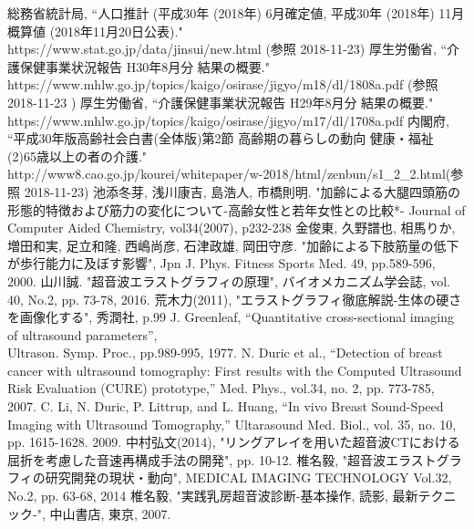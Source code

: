 \begin{thebibliography}{9}
   総務省統計局, 
    ``人口推計 (平成30年 (2018年) 6月確定値, 平成30年 (2018年) 11月概算値 (2018年11月20日公表)." \\https://www.stat.go.jp/data/jinsui/new.html  (参照 2018-11-23)
   厚生労働省,
    ``介護保健事業状況報告 H30年8月分 結果の概要." \\https://www.mhlw.go.jp/topics/kaigo/osirase/jigyo/m18/dl/1808a.pdf  (参照 2018-11-23 )
    厚生労働省,
    ``介護保健事業状況報告 H29年8月分 結果の概要." \\https://www.mhlw.go.jp/topics/kaigo/osirase/jigyo/m17/dl/1708a.pdf
     内閣府,
    ``平成30年版高齢社会白書(全体版)第2節 高齢期の暮らしの動向 健康・福祉 (2)65歳以上の者の介護."\\http://www8.cao.go.jp/kourei/whitepaper/w-2018/html/zenbun/s1\_2\_2.html(参照
    2018-11-23)
     池添冬芽, 浅川康吉, 島浩人, 市橋則明.
    "加齢による大腿四頭筋の形態的特徴および筋力の変化について-高齢女性と若年女性との比較*- Journal of Computer Aided Chemistry, vol34(2007), p232-238
     金俊東, 久野譜也, 相馬りか, 増田和実, 足立和隆, 西嶋尚彦, 石津政雄, 岡田守彦.
    "加齢による下肢筋量の低下が歩行能力に及ぼす影響", Jpn J. Phys. Fitness Sports Med. 49, pp.589-596, 2000.
     山川誠. 
    "超音波エラストグラフィの原理", バイオメカニズム学会誌, vol. 40, No.2, pp. 73-78, 2016.
      荒木力(2011), 
    "エラストグラフィ徹底解説-生体の硬さを画像化する", 秀潤社, p.99
     J. Greenleaf, 
    “Quantitative cross-sectional imaging of ultrasound parameters”, \\Ultrason. Symp. Proc., 
    pp.989-995, 1977.
     N. Duric et al.,
     “Detection of breast cancer with ultrasound tomography: First results with the Computed Ultrasound Risk Evaluation (CURE) prototype,” Med. Phys., vol.34, no. 2, pp. 773-785, 2007.
      C. Li, N. Duric, P. Littrup, and L. Huang, 
     “In vivo Breast Sound-Speed Imaging with Ultrasound Tomography,” Ultarasound Med. Biol., vol. 35, no. 10, pp. 1615-1628. 2009.
      中村弘文(2014), 
     "リングアレイを用いた超音波CTにおける屈折を考慮した音速再構成手法の開発", pp. 10-12.
      椎名毅,
     "超音波エラストグラフィの研究開発の現状・動向", MEDICAL IMAGING TECHNOLOGY Vol.32, No.2, pp. 63-68, 2014
      椎名毅,
     "実践乳房超音波診断-基本操作, 読影, 最新テクニック-", 中山書店, 東京, 2007.

\end{thebibliography}
